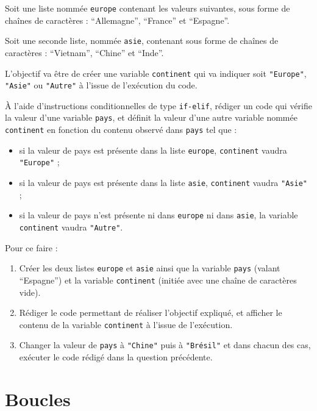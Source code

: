 \documentclass[
  12pt,
]{book}
\makeatletter
\providecommand{\tightlist}{%
  \setlength{\itemsep}{0pt}\setlength{\parskip}{0pt}}
\numberwithin{equation}{section}
\numberwithin{countremarque}{section}
\newenvironment{exframe}{%
 \def\at@end@of@exframe{}%
 \ifinner\ifhmode%
  \def\at@end@of@exframe{\end{minipage}}%
  \begin{minipage}{\columnwidth}%
 \fi\fi%
 \def\FrameCommand##1{\hskip\@totalleftmargin \hskip-\fboxsep
 \colorbox{shadecolorex}{##1}\hskip-\fboxsep
     \hskip-\linewidth \hskip-\@totalleftmargin \hskip\columnwidth}%
 \MakeFramed {\advance\hsize-\width
   \@totalleftmargin\z@ \linewidth\hsize
   \@setminipage}}%
 {\par\unskip\endMakeFramed%
 \at@end@of@exframe}
\makeatother
\begin{document}
\begin{exframe}
Soit une liste nommée \texttt{europe} contenant les valeurs suivantes, sous forme de chaînes de caractères : ``Allemagne'', ``France'' et ``Espagne''.

Soit une seconde liste, nommée \texttt{asie}, contenant sous forme de chaînes de caractères : ``Vietnam'', ``Chine'' et ``Inde''.

L'objectif va être de créer une variable \texttt{continent} qui va indiquer soit \texttt{"Europe"}, \texttt{"Asie"} ou \texttt{"Autre"} à l'issue de l'exécution du code.

À l'aide d'instructions conditionnelles de type \texttt{if-elif}, rédiger un code qui vérifie la valeur d'une variable \texttt{pays}, et définit la valeur d'une autre variable nommée \texttt{continent} en fonction du contenu observé dans \texttt{pays} tel que :

\begin{itemize}
\tightlist
\item
  si la valeur de pays est présente dans la liste \texttt{europe}, \texttt{continent} vaudra \texttt{"Europe"} ;
\item
  si la valeur de pays est présente dans la liste \texttt{asie}, \texttt{continent} vaudra \texttt{"Asie"} ;
\item
  si la valeur de pays n'est présente ni dans \texttt{europe} ni dans \texttt{asie}, la variable \texttt{continent} vaudra \texttt{"Autre"}.
\end{itemize}

Pour ce faire :

\begin{enumerate}
\def\labelenumi{\arabic{enumi}.}
\tightlist
\item
  Créer les deux listes \texttt{europe} et \texttt{asie} ainsi que la variable \texttt{pays} (valant ``Espagne'') et la variable \texttt{continent} (initiée avec une chaîne de caractères vide).
\item
  Rédiger le code permettant de réaliser l'objectif expliqué, et afficher le contenu de la variable \texttt{continent} à l'issue de l'exécution.
\item
  Changer la valeur de \texttt{pays} à \texttt{"Chine"} puis à \texttt{"Brésil"} et dans chacun des cas, exécuter le code rédigé dans la question précédente.
\end{enumerate}
\end{exframe}

\chapter{Boucles}\label{boucles}
\end{document}
